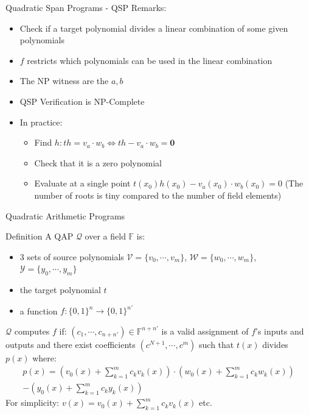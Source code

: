 \documentclass[handout]{beamer}
\begin{document}
\begin{frame}[allowframebreaks]{Quadratic Span Programs - QSP}
Remarks: 

\begin{itemize}
    \item Check if a target polynomial divides a linear combination of some given polynomials  
    \item $f$ restricts which polynomials can be used in the linear combination  
    \item The NP witness are the $a,b$  
    \item QSP Verification is NP-Complete  
    \item In practice:
    \begin{itemize}
        \item Find $h: th = v_a \cdot w_b \Leftrightarrow th - v_a \cdot w_b = \textbf{0}$       
        \item Check that it is a zero polynomial  
        \item Evaluate at a single point $t(x_0)h(x_0) - v_a(x_0) \cdot w_b(x_0) = 0$ (The number of roots is tiny compared to the number of field elements)
     \end{itemize}
\end{itemize} 
\end{frame}

\begin{frame}[allowframebreaks]{Quadratic Arithmetic Programs}
\begin{block}{Definition}
A QAP $\mathcal{Q}$ over a field $\mathbb{F}$ is:  
\begin{itemize}
    \item 3 sets of source polynomials $\mathcal{V} = \{v_0, \cdots, v_m \}$, $\mathcal{W} = \{ w_0, \cdots, w_m \}$, $\mathcal{Y}  = \{y_0, \cdots, y_m \}$  
    \item the target polynomial $t$  
    \item a function $f : \{0,1\}^n \rightarrow \{0,1\}^{n'}$
\end{itemize}
\end{block}

\framebreak

$\mathcal{Q}$ computes $f$ if:  
 $ (c_1, \cdots ,c_{n+n'}) \in \mathbb{F}^{n+n'}$ is a valid assignment of
$f$’s inputs and outputs and there exist coefficients $(c^{N+1},\cdots,c^m)$ such that $t(x)$ divides $p(x)$ where:
\begin{align*}
p(x) = (v_0(x)+\sum_{k=1}^m c_k v_k(x)) \cdot (w_0(x)+  \sum_{k=1}^m c_k w_k(x))\\ - (y_0(x)+\sum_{k=1}^m c_k y_k(x))
\end{align*}
For simplicity: $v(x)= v_0(x)+\sum_{k=1}^m c_k v_k(x)$ etc.
\end{frame}
\end{document}
